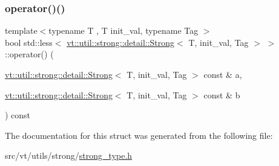 \subsubsection{\texorpdfstring{operator()()}{operator()()}}
{\footnotesize\ttfamily template$<$typename T , T init\+\_\+val, typename Tag $>$ \\
bool std\+::less$<$ \hyperlink{structvt_1_1util_1_1strong_1_1detail_1_1_strong}{vt\+::util\+::strong\+::detail\+::\+Strong}$<$ T, init\+\_\+val, Tag $>$ $>$\+::operator() (\begin{DoxyParamCaption}\item[{\hyperlink{structvt_1_1util_1_1strong_1_1detail_1_1_strong}{vt\+::util\+::strong\+::detail\+::\+Strong}$<$ T, init\+\_\+val, Tag $>$ const \&}]{a,  }\item[{\hyperlink{structvt_1_1util_1_1strong_1_1detail_1_1_strong}{vt\+::util\+::strong\+::detail\+::\+Strong}$<$ T, init\+\_\+val, Tag $>$ const \&}]{b }\end{DoxyParamCaption}) const\hspace{0.3cm}{\ttfamily [inline]}}



The documentation for this struct was generated from the following file\+:\begin{DoxyCompactItemize}
\item 
src/vt/utils/strong/\hyperlink{strong__type_8h}{strong\+\_\+type.\+h}\end{DoxyCompactItemize}

